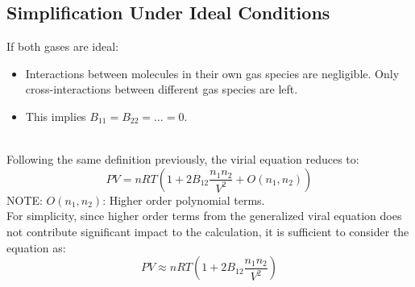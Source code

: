 \documentclass{article}
\begin{document}
\subsection*{Simplification Under Ideal Conditions}
If both gases are ideal:
\begin{itemize}
    \item Interactions between molecules in their own gas species are negligible. Only cross-interactions
    between different gas species are left.
    \item This implies \( B_{11} = B_{22} = \ldots = 0 \).
\end{itemize}
\\
Following the same definition previously, the virial equation reduces to:
\[ PV = nRT \left( 1 + 2B_{12} \frac{n_1n_2}{V^2} + O(n_1, n_2) \right) \]
NOTE: $O(n_1, n_2)$: Higher order polynomial terms.
\\
For simplicity, since higher order terms from the generalized viral equation does not contribute significant impact to the calculation, it is 
sufficient to consider the equation as:
\[  PV \approx nRT \left( 1 + 2B_{12} \frac{n_1n_2}{V^2} \right)\]
\end{document}
